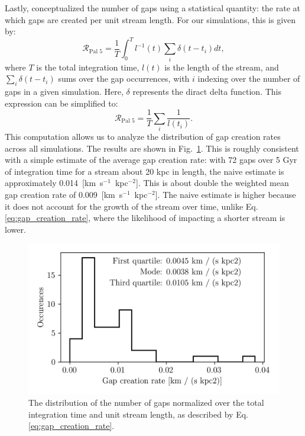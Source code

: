 \documentclass{aa}
\begin{document}
    Lastly, \citet{2012ApJ...748...20C} conceptualized the number of gaps using a statistical quantity: the rate at which gaps are created per unit stream length. For our simulations, this is given by: \begin{equation} \label{eq:gap_creation_rate}
    \mathcal{R}_{\textrm{Pal 5}} =  \frac{1}{T}\int_{0}^T l^{-1}(t) \sum_i \delta(t-t_i) dt,\end{equation}where $T$ is the total integration time, $l(t)$ is the length of the stream, and $\sum_i \delta(t-t_i)$ sums over the gap occurrences, with $i$ indexing over the number of gaps in a given simulation. Here, $\delta$ represents the diract delta function. This expression can be simplified to:\begin{equation}\mathcal{R}_{\textrm{Pal 5}} =  \frac{1}{T} \sum_i \frac{1}{l (t_i)}. \end{equation}
    This computation allows us to analyze the distribution of gap creation rates across all simulations. The results are shown in Fig.~\ref{fig:TailCoordinates}. This is roughly consistent with a simple estimate of the average gap creation rate: with 72 gaps over 5 Gyr of integration time for a stream about 20 kpc in length, the naive estimate is approximately 0.014~[km~s$^{-1}$~kpc$^{-2}$]. This is about double the weighted mean gap creation rate of 0.009~[km~s$^{-1}$~kpc$^{-2}$]. The naive estimate is higher because it does not account for the growth of the stream over time, unlike Eq.\ref{eq:gap_creation_rate}, where the likelihood of impacting a shorter stream is lower.

      \begin{figure}
        \centering
        \includegraphics[width=\linewidth]{gap_creation_rate.png}
        \caption{The distribution of the number of gaps normalized over the total integration time and unit stream length, as described by Eq.\ref{eq:gap_creation_rate}. }
        \label{fig:TailCoordinates}
      \end{figure}
      
\end{document}
